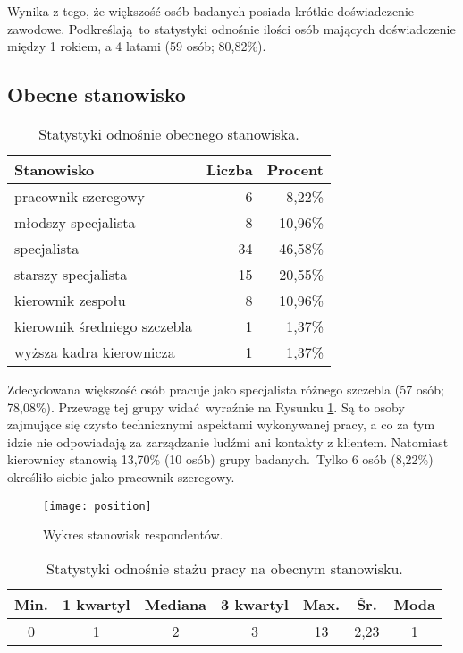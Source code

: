 Wynika z tego, że większość osób badanych posiada krótkie doświadczenie zawodowe. Podkreślają to statystyki odnośnie ilości osób mających doświadczenie między 1 rokiem, a 4 latami (59 osób; 80,82\%).

\subsection{Obecne stanowisko}

\begin{table}[h!]
\begin{center}
\begin{tabular}{l r r}
Stanowisko & Liczba & Procent \\ \hline
pracownik szeregowy & 6 & 8,22\% \\
młodszy specjalista & 8 & 10,96\% \\
specjalista & 34 & 46,58\% \\
starszy specjalista & 15 & 20,55\% \\
kierownik zespołu & 8 & 10,96\% \\
kierownik średniego szczebla & 1 & 1,37\% \\
wyższa kadra kierownicza & 1 & 1,37\% \\
\end{tabular}
\end{center}
\caption{Statystyki odnośnie obecnego stanowiska.}
\label{tab:position-stats}
\end{table}

Zdecydowana większość osób pracuje jako specjalista różnego szczebla (57 osób; 78,08\%). Przewagę tej grupy widać wyraźnie na Rysunku \ref{fig:position}. Są to osoby zajmujące się czysto technicznymi aspektami wykonywanej pracy, a co za tym idzie nie odpowiadają za zarządzanie ludźmi ani kontakty z klientem. Natomiast kierownicy stanowią 13,70\% (10 osób) grupy badanych. Tylko 6 osób (8,22\%) określiło siebie jako pracownik szeregowy.

\begin{figure}[h]
\begin{center}
\texttt{[image: position]}
\end{center}
\caption{Wykres stanowisk respondentów.}
\label{fig:position}
\end{figure}

\begin{table}[h!]
\begin{center}
\begin{tabular}{c c c c c c c}
Min. & 1 kwartyl & Mediana & 3 kwartyl & Max. & Śr. & Moda \\ \hline
0 & 1 & 2 & 3 & 13 & 2,23 & 1 \\
\end{tabular}
\end{center}
\caption{Statystyki odnośnie stażu pracy na obecnym stanowisku.}
\label{tab:position-years-stats}
\end{table}

